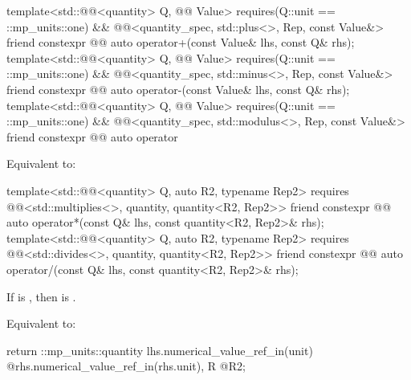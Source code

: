 \begin{itemdecl}
template<std::@@<quantity> Q, @@ Value>
  requires(Q::unit == ::mp_units::one) &&
          @@<quantity_spec, std::plus<>, Rep, const Value&>
friend constexpr @@ auto operator+(const Value& lhs, const Q& rhs);
template<std::@@<quantity> Q, @@ Value>
  requires(Q::unit == ::mp_units::one) &&
          @@<quantity_spec, std::minus<>, Rep, const Value&>
friend constexpr @@ auto operator-(const Value& lhs, const Q& rhs);
template<std::@@<quantity> Q, @@ Value>
  requires(Q::unit == ::mp_units::one) &&
          @@<quantity_spec, std::modulus<>, Rep, const Value&>
friend constexpr @@ auto operator%
\end{itemdecl}

\begin{itemdescr}
\pnum
\effects
Equivalent to:
\end{itemdescr}

\begin{itemdecl}
template<std::@@<quantity> Q, auto R2, typename Rep2>
  requires @@<std::multiplies<>, quantity, quantity<R2, Rep2>>
friend constexpr @@ auto operator*(const Q& lhs, const quantity<R2, Rep2>& rhs);
template<std::@@<quantity> Q, auto R2, typename Rep2>
  requires @@<std::divides<>, quantity, quantity<R2, Rep2>>
friend constexpr @@ auto operator/(const Q& lhs, const quantity<R2, Rep2>& rhs);
\end{itemdecl}

\begin{itemdescr}
\pnum
\expects
If  is \tcode{/}, then  is .

\pnum
\effects
Equivalent to:
\begin{codeblock}
return ::mp_units::quantity{
  lhs.numerical_value_ref_in(unit) @\atsign@ rhs.numerical_value_ref_in(rhs.unit), R @\atsign@ R2};
\end{codeblock}
\end{itemdescr}

